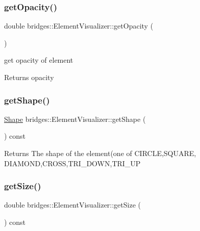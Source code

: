 \subsubsection{\texorpdfstring{getOpacity()}{getOpacity()}}
{\footnotesize\ttfamily double bridges\+::\+Element\+Visualizer\+::get\+Opacity (\begin{DoxyParamCaption}{ }\end{DoxyParamCaption})\hspace{0.3cm}{\ttfamily [inline]}}

get opacity of element

\begin{DoxyReturn}{Returns}
opacity 
\end{DoxyReturn}
\mbox{\label{classbridges_1_1_element_visualizer_a2348ed705c5c6f85082e2aff11d439e7}} 
\subsubsection{\texorpdfstring{getShape()}{getShape()}}
{\footnotesize\ttfamily \mbox{\hyperlink{namespacebridges_a1b4050586bd708782ae0d4f3b06b9579}{Shape}} bridges\+::\+Element\+Visualizer\+::get\+Shape (\begin{DoxyParamCaption}{ }\end{DoxyParamCaption}) const\hspace{0.3cm}{\ttfamily [inline]}}

\begin{DoxyReturn}{Returns}
The shape of the element(one of C\+I\+R\+C\+LE,S\+Q\+U\+A\+RE, D\+I\+A\+M\+O\+ND,C\+R\+O\+SS,T\+R\+I\+\_\+\+D\+O\+WN,T\+R\+I\+\_\+\+UP 
\end{DoxyReturn}
\mbox{\label{classbridges_1_1_element_visualizer_a3a1ab72360099d615ad582e5780143ad}} 
\subsubsection{\texorpdfstring{getSize()}{getSize()}}
{\footnotesize\ttfamily double bridges\+::\+Element\+Visualizer\+::get\+Size (\begin{DoxyParamCaption}{ }\end{DoxyParamCaption}) const\hspace{0.3cm}{\ttfamily [inline]}}

